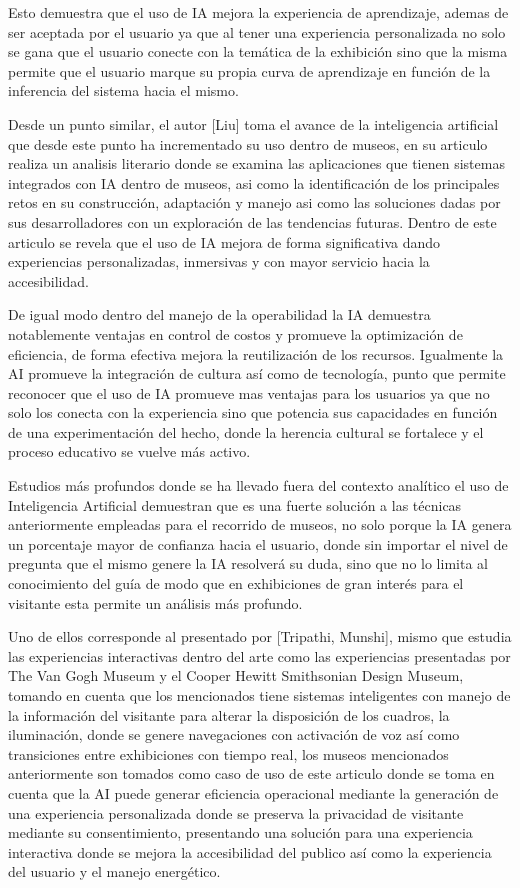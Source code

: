 \documentclass[pdflatex,sn-mathphys-num]{sn-jnl}%
\theoremstyle{thmstyleone}%
\theoremstyle{thmstyletwo}%
\theoremstyle{thmstylethree}%
\begin{document}
Esto demuestra que el uso de IA mejora la experiencia de aprendizaje, ademas de ser aceptada por el usuario ya que al tener una experiencia personalizada no solo se gana que el usuario conecte con la temática de la exhibición sino que la misma permite que el usuario marque su propia curva de aprendizaje en función de la inferencia del sistema hacia el mismo.

Desde un punto similar, el autor [Liu] toma el avance de la inteligencia artificial que desde este punto ha incrementado su uso dentro de museos, en su articulo realiza un analisis literario donde se examina las aplicaciones que tienen sistemas integrados con IA dentro de museos, asi como la identificación de los principales retos en su construcción, adaptación y manejo asi como las soluciones dadas por sus desarrolladores con un exploración de las tendencias futuras. Dentro de este articulo se revela que el uso de IA mejora de forma significativa dando experiencias personalizadas, inmersivas y con mayor servicio hacia la accesibilidad.\cite{Iodice2025AI}

De igual modo dentro del manejo de la operabilidad la IA demuestra notablemente ventajas en control de costos y promueve la optimización de eficiencia, de forma efectiva mejora la reutilización de los recursos. Igualmente la AI promueve la integración de cultura así como de tecnología, punto que permite reconocer que el uso de IA promueve mas ventajas para los usuarios ya que no solo los conecta con la experiencia sino que potencia sus capacidades en función de una experimentación del hecho, donde la herencia cultural se fortalece y el proceso educativo se vuelve más activo.

Estudios más profundos donde se ha llevado fuera del contexto analítico el uso de Inteligencia Artificial demuestran que es una fuerte solución a las técnicas anteriormente empleadas para el recorrido de museos, no solo porque la IA genera un porcentaje mayor de confianza hacia el usuario, donde sin importar el nivel de pregunta que el mismo genere la IA resolverá su duda, sino que no lo limita al conocimiento del guía de modo que en exhibiciones de gran interés para el visitante esta permite un análisis más profundo.

Uno de ellos corresponde al presentado por [Tripathi, Munshi], mismo que estudia las experiencias interactivas dentro del arte como las experiencias presentadas por The Van Gogh Museum y el Cooper Hewitt Smithsonian Design Museum, tomando en cuenta que los mencionados tiene sistemas inteligentes con manejo de la información del visitante para alterar la disposición de los cuadros, la iluminación, donde se genere navegaciones con activación de voz así como transiciones entre exhibiciones con tiempo real, los museos mencionados anteriormente son tomados como caso de uso de este articulo donde se toma en cuenta que la AI puede generar eficiencia operacional  mediante la generación de una experiencia personalizada donde se preserva la privacidad de visitante mediante su consentimiento, presentando una solución para una experiencia interactiva donde se mejora la accesibilidad del publico así como la experiencia del usuario y el manejo energético.\cite{Tripathi2025HumanCentered}
\end{document}
